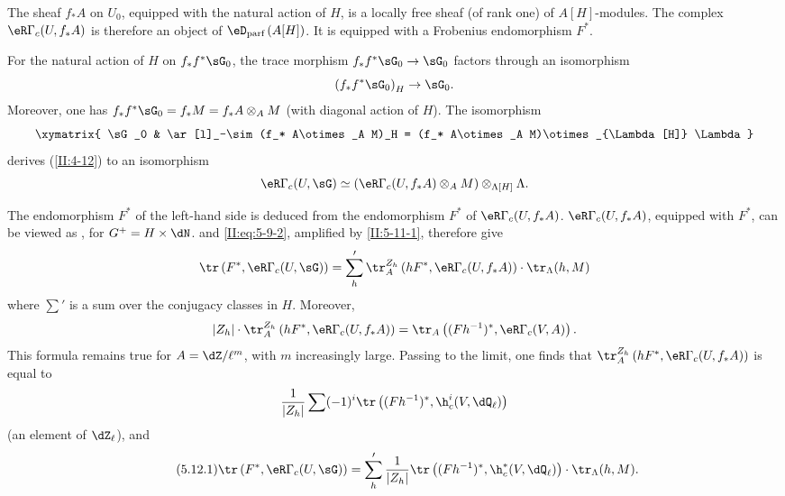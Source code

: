 The sheaf $f_* A$ on $U_0$, equipped with the natural action of $H$, is a
locally free sheaf (of rank one) of $A[H]$-modules. The complex
$\eR\Gamma_c(U,f_* A)$ is therefore an object of
$\eD_\text{parf}\left(A[H]\right)$. It is equipped with a Frobenius
endomorphism $F^*$.

For the natural action of $H$ on $f_* f^*\sG_0$, the trace morphism
$f_* f^*\sG_0\to\sG_0$ factors through an isomorphism
\[
  \left(f_* f^*\sG_0\right)_H \to \sG_0 \text{.}
\]
Moreover, one has $f_* f^*\sG_0=f_* M=f_* A\otimes_A M$ (with diagonal action of
$H$). The isomorphism
\[\xymatrix{
  \sG_0
    & \ar[l]_-\sim (f_* A\otimes_A M)_H = (f_* A\otimes_A M)\otimes_{\Lambda[H]} \Lambda
}\]
derives (\ref{II:4-12}) to an isomorphism
\[
  \eR\Gamma_c(U,\sG) \simeq \left(\eR\Gamma_c(U,f_* A)\otimes_A M\right)\otimes_{\Lambda[H]} \Lambda \text{.}
\]

The endomorphism $F^*$ of the left-hand side is deduced from the
endomorphism $F^*$ of $\eR\Gamma_c(U,f_* A)$.  $\eR\Gamma_c(U,f_* A)$, equipped with $F^*$, can be
viewed as , for $G^+=H\times \dN$.
 and \eqref{II:eq:5-9-2}, amplified by
\ref{II:5-11-1}, therefore give
\[
  \tr\left(F^*,\eR\Gamma_c(U,\sG)\right) = \sum_h' \tr_A^{Z_h}\left(h F^*,\eR\Gamma_c(U,f_* A)\right)\cdot \tr_\Lambda(h,M)
\]
where $\sum'$ is a sum over the conjugacy classes in $H$. Moreover,
\[
  |Z_h|\cdot \tr_A^{Z_h}\left(h F^*,\eR\Gamma_c(U,f_* A)\right) = \tr_A\left((F h^{-1})^*,\eR\Gamma_c(V,A)\right) \text{.}
\]
This formula remains true for $A=\dZ/\ell^m$, with $m$ increasingly large.
Passing to the limit, one finds that
$\tr_A^{Z_h}\left(h F^*,\eR\Gamma_c(U,f_* A)\right)$ is equal to
\[
  \frac{1}{|Z_h|} \sum (-1)^i \tr\left((F h^{-1})^*,\h_c^i(V,\dQ_\ell)\right)
\]
(an element of $\dZ_\ell$), and
\begin{equation*}\tag{5.12.1}\label{II:eq:5-12-1}
\tr\left(F^*,\eR\Gamma_c(U,\sG)\right) = \sum_h' \frac{1}{|Z_h|} \tr\left((F h^{-1})^*,\h_c^*(V,\dQ_\ell)\right)\cdot \tr_\Lambda(h,M) \text{.}
\end{equation*}






\subsection{}\label{II:5-13}

